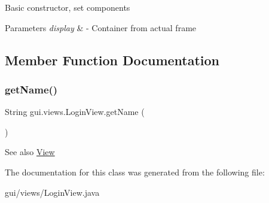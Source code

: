 Basic constructor, set components 
\begin{DoxyParams}{Parameters}
{\em display} & -\/ Container from actual frame \\
\hline
\end{DoxyParams}


\subsection{Member Function Documentation}
\mbox{\label{classgui_1_1views_1_1_login_view_af4b196f0c4956bd079e4f6c14e575ff8}} 
\subsubsection{\texorpdfstring{get\+Name()}{getName()}}
{\footnotesize\ttfamily String gui.\+views.\+Login\+View.\+get\+Name (\begin{DoxyParamCaption}{ }\end{DoxyParamCaption})\hspace{0.3cm}{\ttfamily [inline]}}

\begin{DoxySeeAlso}{See also}
\mbox{\hyperlink{classgui_1_1views_1_1_view}{View}} 
\end{DoxySeeAlso}


The documentation for this class was generated from the following file\+:\begin{DoxyCompactItemize}
\item 
gui/views/Login\+View.\+java\end{DoxyCompactItemize}

